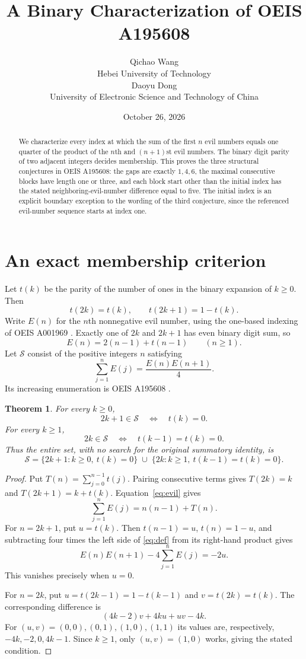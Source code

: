 \documentclass[10pt]{article}
\title{A Binary Characterization of OEIS A195608}
\author{Qichao Wang\\{\small Hebei University of Technology}\\[0.3em]
Daoyu Dong\\{\small University of Electronic Science and Technology of China}}
\date{October 26, 2026}
\newtheorem{theorem}{Theorem}
\newcommand{\tm}{t}
\begin{document}
\maketitle
\begin{abstract}
We characterize every index at which the sum of the first $n$ evil
numbers equals one quarter of the product of the $n$th and $(n+1)$st
evil numbers. The binary digit parity of two adjacent integers decides
membership. This proves the three structural conjectures in OEIS
A195608: the gaps are exactly $1,4,6$, the maximal consecutive blocks
have length one or three, and each block start other than the initial
index has the stated neighboring-evil-number difference equal to five.
The initial index is an explicit boundary exception to the wording of
the third conjecture, since the referenced evil-number sequence starts
at index one.
\end{abstract}

\section{An exact membership criterion}
Let $\tm(k)$ be the parity of the number of ones in the binary
expansion of $k\ge0$. Then
\[
 \tm(2k)=\tm(k),\qquad \tm(2k+1)=1-\tm(k).
\]
Write $E(n)$ for the $n$th nonnegative evil number, using the
one-based indexing of OEIS A001969 \cite{evil}. Exactly one of $2k$
and $2k+1$ has even binary digit sum, so
\begin{equation}\label{eq:evil}
 E(n)=2(n-1)+\tm(n-1)\qquad(n\ge1).
\end{equation}
Let $\mathcal S$ consist of the positive integers $n$ satisfying
\begin{equation}\label{eq:def}
 \sum_{j=1}^n E(j)=\frac{E(n)E(n+1)}4.
\end{equation}
Its increasing enumeration is OEIS A195608 \cite{target}.

\begin{theorem}\label{thm:membership}
For every $k\ge0$,
\[
 2k+1\in\mathcal S\quad\Longleftrightarrow\quad \tm(k)=0.
\]
For every $k\ge1$,
\[
 2k\in\mathcal S\quad\Longleftrightarrow\quad
 \tm(k-1)=\tm(k)=0.
\]
Thus the entire set, with no search for the original summatory
identity, is
\[
 \mathcal S=\{2k+1:k\ge0,\ \tm(k)=0\}
 \;\cup\;\{2k:k\ge1,\ \tm(k-1)=\tm(k)=0\}.
\]
\end{theorem}
\begin{proof}
Put $T(n)=\sum_{j=0}^{n-1}\tm(j)$. Pairing consecutive terms gives
$T(2k)=k$ and $T(2k+1)=k+\tm(k)$. Equation~\eqref{eq:evil} gives
\[
 \sum_{j=1}^n E(j)=n(n-1)+T(n).
\]
For $n=2k+1$, put $u=\tm(k)$. Then
$\tm(n-1)=u$, $\tm(n)=1-u$, and subtracting four times the left
side of \eqref{eq:def} from its right-hand product gives
\[
 E(n)E(n+1)-4\sum_{j=1}^n E(j)=-2u.
\]
This vanishes precisely when $u=0$.

For $n=2k$, put $u=\tm(2k-1)=1-\tm(k-1)$ and
$v=\tm(2k)=\tm(k)$. The corresponding difference is
\[
 (4k-2)v+4ku+uv-4k.
\]
For $(u,v)=(0,0),(0,1),(1,0),(1,1)$ its values are,
respectively, $-4k,-2,0,4k-1$. Since $k\ge1$, only $(u,v)=(1,0)$
works, giving the stated condition.
\end{proof}
\end{document}

